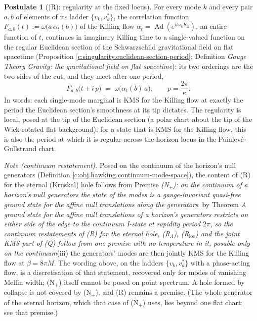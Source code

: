 \documentclass[11pt]{article}
\theoremstyle{definition}
\newtheorem{postulate}[theorem]{Postulate}
\theoremstyle{plain}
\begin{document}
\begin{postulate}[(R): regularity at the fixed locus]\label{c:singularity.r-regularity-fixed-locus}
For every mode $k$ and every pair $a, b$ of elements of its ladder $\{v_k, v_k^{*}\}$, the correlation function $F_{a,b}(t) := \omega\bigl(a\,\alpha_t(b)\bigr)$ of the Killing flow $\alpha_t = \operatorname{Ad}(e^{it\omega_k K_k})$, an entire function of $t$, continues in imaginary Killing time to a single-valued function on the regular Euclidean section of the Schwarzschild gravitational field on flat spacetime (Proposition \ref{c:singularity.euclidean-section-period}; Definition \emph{Gauge Theory Gravity: the gravitational field on flat spacetime}): its two orderings are the two sides of the cut, and they meet after one period,
\[
F_{a,b}\bigl(t + i\,p\bigr) \;=\; \omega\bigl(\alpha_t(b)\,a\bigr), \qquad p = \frac{2\pi}{\kappa} .
\]
In words: each single-mode marginal is KMS for the Killing flow at exactly the period the Euclidean section's smoothness at its tip dictates. The regularity is local, posed at the tip of the Euclidean section (a polar chart about the tip of the Wick-rotated flat background); for a state that is KMS for the Killing flow, this is also the period at which it is regular across the horizon locus in the Painlev\'e-Gullstrand chart.

\emph{Note (continuum restatement).} Posed on the continuum of the horizon's null generators (Definition \ref{c:obj.hawking.continuum-mode-space}), the content of (R) for the eternal (Kruskal) hole follows from Premise \emph{(N$_{+}$): on the continuum of a horizon's null generators the state of the modes is a gauge-invariant quasi-free ground state for the affine null translations along the generators}: by Theorem \emph{A ground state for the affine null translations of a horizon's generators restricts on either side of the edge to the continuum I-state at rapidity period $2\pi$, so the continuum restatements of (R) for the eternal hole, (R$_{\Lambda}$), (R$_{\mathrm{loc}}$) and the joint KMS part of (Q) follow from one premise with no temperature in it, posable only on the continuum}(iii) the generators' modes are then jointly KMS for the Killing flow at $\beta = 8\pi M$. The wording above, on the ladders $\{v_{k}, v_{k}^{*}\}$ with a phase-acting flow, is a discretisation of that statement, recovered only for modes of vanishing Mellin width; (N$_{+}$) itself cannot be posed on point spectrum. A hole formed by collapse is not covered by (N$_{+}$), and (R) remains a premise. (The whole generator of the eternal horizon, which that case of (N$_{+}$) uses, lies beyond one flat chart; see that premise.)
\end{postulate}
\end{document}
